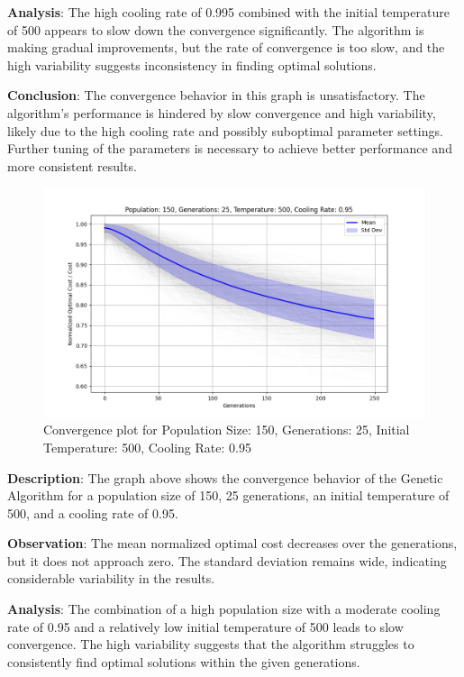 \documentclass{article}
\begin{document}
    \textbf{Analysis}: The high cooling rate of 0.995 combined with the initial temperature of 500 appears to slow down the convergence significantly. The algorithm is making gradual improvements, but the rate of convergence is too slow, and the high variability suggests inconsistency in finding optimal solutions.

    \textbf{Conclusion}: The convergence behavior in this graph is unsatisfactory. The algorithm's performance is hindered by slow convergence and high variability, likely due to the high cooling rate and possibly suboptimal parameter settings. Further tuning of the parameters is necessary to achieve better performance and more consistent results.


    \begin{figure}[H]
        \centering
        \includegraphics[width=\textwidth]{genetic_simulated_annealing_hybrid/Population_150_Generations_25_Temperature_500_CoolingRate_0.95}
        \caption{Convergence plot for Population Size: 150, Generations: 25, Initial Temperature: 500, Cooling Rate: 0.95}
        \label{fig:pop150_gen25_temp500_cr0.95}
    \end{figure}

    \textbf{Description}: The graph above shows the convergence behavior of the Genetic Algorithm for a population size of 150, 25 generations, an initial temperature of 500, and a cooling rate of 0.95.

    \textbf{Observation}: The mean normalized optimal cost decreases over the generations, but it does not approach zero. The standard deviation remains wide, indicating considerable variability in the results.

    \textbf{Analysis}: The combination of a high population size with a moderate cooling rate of 0.95 and a relatively low initial temperature of 500 leads to slow convergence. The high variability suggests that the algorithm struggles to consistently find optimal solutions within the given generations.
\end{document}
